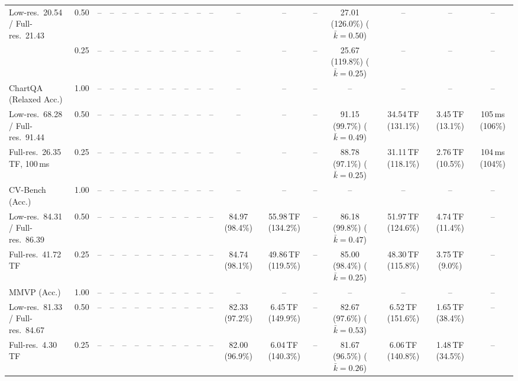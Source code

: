 \begin{table}[t]
{\begin{tabular}{l c | c c c c | c c c c | c c | c c c | c c c c}
{\footnotesize Low-res.\ 20.54 / Full-res.\ 21.43} & 0.50 & -- & -- & -- & -- & -- & -- & -- & -- & -- & -- & -- & -- & -- & \cellcolor{gray!15}27.01 (126.0\%) {\footnotesize ($\bar k{=}0.50$)} & -- & -- & -- \\
 & 0.25 & -- & -- & -- & -- & -- & -- & -- & -- & -- & -- & -- & -- & -- & \cellcolor{gray!15}25.67 (119.8\%) {\footnotesize ($\bar k{=}0.25$)} & -- & -- & -- \\
\cmidrule(lr){1-19}
ChartQA (Relaxed Acc.) & 1.00 & -- & -- & -- & -- & -- & -- & -- & -- & -- & -- & -- & -- & -- & -- & -- & -- & -- \\
{\footnotesize Low-res.\ 68.28 / Full-res.\ 91.44} & 0.50 & -- & -- & -- & -- & -- & -- & -- & -- & -- & -- & -- & -- & -- & \cellcolor{gray!15}91.15 (99.7\%) {\footnotesize ($\bar k{=}0.49$)} & 34.54\,TF (131.1\%) & 3.45\,TF (13.1\%) & 105\,ms (106\%) \\
{\footnotesize Full-res.\ 26.35\,TF, 100\,ms} & 0.25 & -- & -- & -- & -- & -- & -- & -- & -- & -- & -- & -- & -- & -- & 88.78 (97.1\%) {\footnotesize ($\bar k{=}0.25$)} & 31.11\,TF (118.1\%) & 2.76\,TF (10.5\%) & 104\,ms (104\%) \\
\cmidrule(lr){1-19}
CV-Bench (Acc.) & 1.00 & -- & -- & -- & -- & -- & -- & -- & -- & -- & -- & -- & -- & -- & -- & -- & -- & -- \\
{\footnotesize Low-res.\ 84.31 / Full-res.\ 86.39} & 0.50 & -- & -- & -- & -- & -- & -- & -- & -- & -- & -- & \cellcolor{gray!15}84.97 (98.4\%) & 55.98\,TF (134.2\%) & -- & \cellcolor{gray!15}86.18 (99.8\%) {\footnotesize ($\bar k{=}0.47$)} & 51.97\,TF (124.6\%) & 4.74\,TF (11.4\%) & -- \\
{\footnotesize Full-res.\ 41.72\,TF} & 0.25 & -- & -- & -- & -- & -- & -- & -- & -- & -- & -- & \cellcolor{gray!15}84.74 (98.1\%) & 49.86\,TF (119.5\%) & -- & \cellcolor{gray!15}85.00 (98.4\%) {\footnotesize ($\bar k{=}0.25$)} & 48.30\,TF (115.8\%) & 3.75\,TF (9.0\%) & -- \\
\cmidrule(lr){1-19}
MMVP (Acc.) & 1.00 & -- & -- & -- & -- & -- & -- & -- & -- & -- & -- & -- & -- & -- & -- & -- & -- & -- \\
{\footnotesize Low-res.\ 81.33 / Full-res.\ 84.67} & 0.50 & -- & -- & -- & -- & -- & -- & -- & -- & -- & -- & 82.33 (97.2\%) & 6.45\,TF (149.9\%) & -- & 82.67 (97.6\%) {\footnotesize ($\bar k{=}0.53$)} & 6.52\,TF (151.6\%) & 1.65\,TF (38.4\%) & -- \\
{\footnotesize Full-res.\ 4.30\,TF} & 0.25 & -- & -- & -- & -- & -- & -- & -- & -- & -- & -- & 82.00 (96.9\%) & 6.04\,TF (140.3\%) & -- & 81.67 (96.5\%) {\footnotesize ($\bar k{=}0.26$)} & 6.06\,TF (140.8\%) & 1.48\,TF (34.5\%) & -- \\

\end{tabular}}
\end{table}
